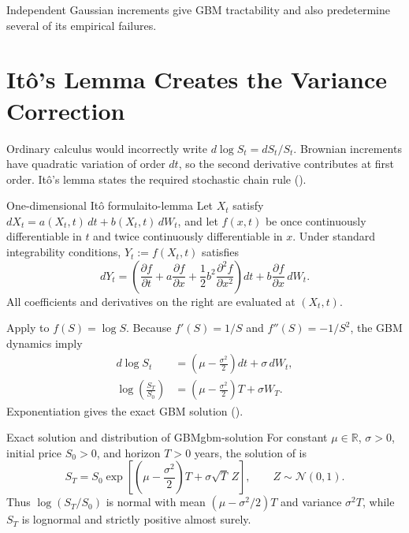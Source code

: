 \documentclass[11pt]{article}
\begin{document}
Independent Gaussian increments give GBM tractability and also predetermine several of its empirical failures.

\section{It\^o's Lemma Creates the Variance Correction}

Ordinary calculus would incorrectly write $d\log S_t=dS_t/S_t$. Brownian increments have quadratic variation of order $dt$, so the second derivative contributes at first order. It\^o's lemma states the required stochastic chain rule ().

\begin{theorem}{One-dimensional It\^o formula}{ito-lemma}
Let $X_t$ satisfy $dX_t=a(X_t,t)\,dt+b(X_t,t)\,dW_t$, and let $f(x,t)$ be once continuously differentiable in $t$ and twice continuously differentiable in $x$. Under standard integrability conditions, $Y_t:=f(X_t,t)$ satisfies
\begin{equation}
  \label{eq:ito-lemma}
  dY_t=
  \left(\frac{\partial f}{\partial t}
  +a\frac{\partial f}{\partial x}
  +\frac{1}{2}b^2\frac{\partial^2f}{\partial x^2}\right)dt
  +b\frac{\partial f}{\partial x}\,dW_t.
\end{equation}
All coefficients and derivatives on the right are evaluated at $(X_t,t)$.
\end{theorem}

Apply  to $f(S)=\log S$. Because $f'(S)=1/S$ and $f''(S)=-1/S^2$, the GBM dynamics imply
\begin{align}
  d\log S_t
  &=\left(\mu-\frac{\sigma^2}{2}\right)dt+\sigma\,dW_t,
  \label{eq:log-gbm}\\
  \log\!\left(\frac{S_T}{S_0}\right)
  &=\left(\mu-\frac{\sigma^2}{2}\right)T+\sigma W_T.
  \label{eq:integrated-log-gbm}
\end{align}
Exponentiation gives the exact GBM solution ().

\begin{proposition}{Exact solution and distribution of GBM}{gbm-solution}
For constant $\mu\in\mathbb{R}$, $\sigma>0$, initial price $S_0>0$, and horizon $T>0$ years, the solution of  is
\begin{equation}
  \label{eq:gbm-solution}
  S_T=S_0\exp\!\left[
  \left(\mu-\frac{\sigma^2}{2}\right)T+\sigma\sqrt{T}\,Z
  \right],
  \qquad Z\sim\mathcal{N}(0,1).
\end{equation}
Thus $\log(S_T/S_0)$ is normal with mean $(\mu-\sigma^2/2)T$ and variance $\sigma^2T$, while $S_T$ is lognormal and strictly positive almost surely.
\end{proposition}
\end{document}
